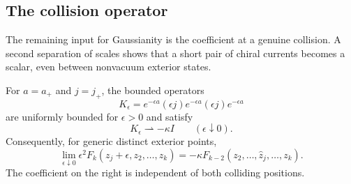 \subsection{The collision operator}

The remaining input for Gaussianity is the coefficient at a genuine
collision. A second separation of scales shows that a short pair of
chiral currents becomes a scalar, even between nonvacuum exterior states.

\begin{lemma}\label{lem:collision}
For $a=a_+$ and $j=j_+$, the bounded operators
\begin{equation}\label{eq:chiral-collision-operator}
 K_\epsilon=e^{-\epsilon a}(\epsilon j)e^{-\epsilon a}
                      (\epsilon j)e^{-\epsilon a}
\end{equation}
are uniformly bounded for $\epsilon>0$ and satisfy
\begin{equation}\label{eq:chiral-collision-limit}
                    K_\epsilon\rightharpoonup-\kappa I
                       \qquad(\epsilon\downarrow0).
\end{equation}
Consequently, for generic distinct exterior points,
\begin{equation}\label{eq:chiral-double-pole}
 \lim_{\epsilon\downarrow0}\epsilon^2
 F_k(z_j+\epsilon,z_2,\ldots,z_k)
   =-\kappa F_{k-2}(z_2,\ldots,\widehat z_j,\ldots,z_k).
\end{equation}
The coefficient on the right is independent of both colliding positions.
\end{lemma}

